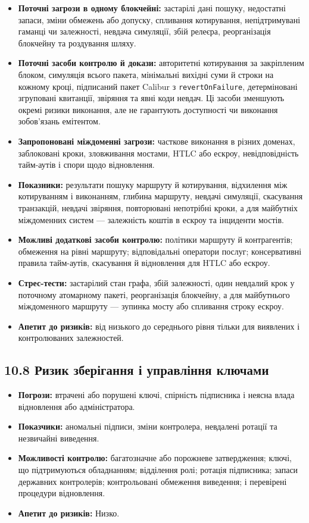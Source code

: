\documentclass[11pt]{article}
\begin{document}
\begin{itemize}[leftmargin=*]
\item \textbf{Поточні загрози в одному блокчейні:} застарілі дані пошуку, недостатні запаси, зміни обмежень або допуску, спливання котирування, непідтримувані гаманці чи залежності, невдача симуляції, збій релеєра, реорганізація блокчейну та роздування шляху.
\item \textbf{Поточні засоби контролю й докази:} авторитетні котирування за закріпленим блоком, симуляція всього пакета, мінімальні вихідні суми й строки на кожному кроці, підписаний пакет Calibur з \texttt{revertOnFailure}, детерміновані згруповані квитанції, звіряння та явні коди невдач. Ці засоби зменшують окремі ризики виконання, але не гарантують доступності чи виконання зобов'язань емітентом.
\item \textbf{Запропоновані міждоменні загрози:} часткове виконання в різних доменах, заблоковані кроки, зловживання мостами, HTLC або ескроу, невідповідність тайм-аутів і спори щодо відновлення.
\item \textbf{Показники:} результати пошуку маршруту й котирування, відхилення між котируванням і виконанням, глибина маршруту, невдачі симуляції, скасування транзакцій, невдачі звіряння, повторювані непотрібні кроки, а для майбутніх міждоменних систем --- залежність коштів в ескроу та інциденти мостів.
\item \textbf{Можливі додаткові засоби контролю:} політики маршруту й контрагентів; обмеження на рівні маршруту; відповідальні оператори послуг; консервативні правила тайм-аутів, скасування й відновлення для HTLC або ескроу.
\item \textbf{Стрес-тести:} застарілий стан графа, збій залежності, один невдалий крок у поточному атомарному пакеті, реорганізація блокчейну, а для майбутнього міждоменного маршруту --- зупинка мосту або спливання строку ескроу.
\item \textbf{Апетит до ризиків:} від низького до середнього рівня тільки для виявлених і контролюваних залежностей.
\end{itemize}
\subsection*{10.8 Ризик зберігання і управління ключами}

\begin{itemize}[leftmargin=*]
\item \textbf{Погрози:} втрачені або порушені ключі, спірність підписника і неясна влада відновлення або адміністратора.
\item \textbf{Показчики:} аномальні підписи, зміни контролера, невдалені ротації та незвичайні виведення.
\item \textbf{Можливості контролю:} багатозначне або порожневе затвердження; ключі, що підтримуються обладнанням; відділення ролі; ротація підписника; запаси державних контролерів; контрольовані обмеження виведення; і перевірені процедури відновлення.
\item \textbf{Апетит до ризиків:} Низко.
\end{itemize}
\end{document}

